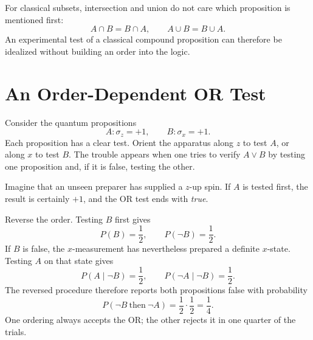 For classical subsets, intersection and union do not care which proposition is mentioned first:
\[
A\cap B=B\cap A,\qquad A\cup B=B\cup A.
\]
An experimental test of a classical compound proposition can therefore be idealized without building an order into the logic.

\section{An Order-Dependent OR Test}

Consider the quantum propositions
\begin{equation}
A:\sigma_z=+1,\qquad B:\sigma_x=+1.
\end{equation}
Each proposition has a clear test. Orient the apparatus along \(z\) to test \(A\), or along \(x\) to test \(B\). The trouble appears when one tries to verify \(A\lor B\) by testing one proposition and, if it is false, testing the other.

Imagine that an unseen preparer has supplied a \(z\)-up spin. If \(A\) is tested first, the result is certainly \(+1\), and the OR test ends with \emph{true}.

Reverse the order. Testing \(B\) first gives
\[
P(B)=\frac12,\qquad P(\neg B)=\frac12.
\]
If \(B\) is false, the \(x\)-measurement has nevertheless prepared a definite \(x\)-state. Testing \(A\) on that state gives
\[
P(A\mid \neg B)=\frac12,\qquad
P(\neg A\mid \neg B)=\frac12.
\]
The reversed procedure therefore reports both propositions false with probability
\begin{equation}
P(\neg B\ \text{then}\ \neg A)
=\frac12\cdot\frac12=\frac14.
\end{equation}
One ordering always accepts the OR; the other rejects it in one quarter of the trials.

\begin{classroomqa}
\end{classroomqa}

\begin{classroomqa}
\end{classroomqa}

